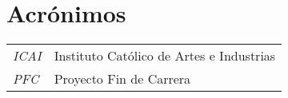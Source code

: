 \clearpage
{}
\chapter*{Acrónimos}

\noindent
\begin{xtabular}{@{}p{1.75cm}@{}l} 
\shrinkheight{-155pt} 
\textsl{ICAI} 	& Instituto Católico de Artes e Industrias \\
\textsl{PFC} 		& Proyecto Fin de Carrera \\
\end{xtabular}